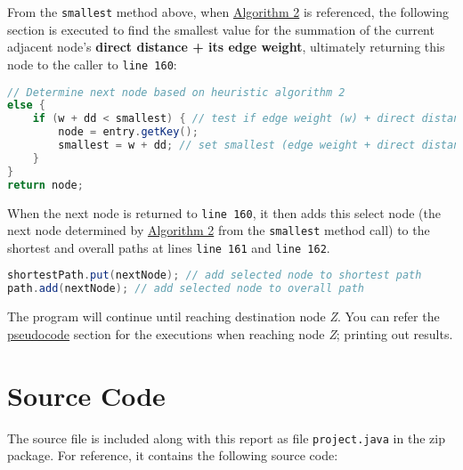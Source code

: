 From the \texttt{smallest} method above, when \hyperref[algo2]{Algorithm 2} is referenced, the following section is executed to find the smallest value for the summation of the current adjacent node's \textbf{direct distance + its edge weight}, ultimately returning this node to the caller to \texttt{line 160}:
\begin{lstlisting}[language=Java]
// Determine next node based on heuristic algorithm 2
else {
    if (w + dd < smallest) { // test if edge weight (w) + direct distance (dd) is smaller than previous
        node = entry.getKey();
        smallest = w + dd; // set smallest (edge weight + direct distance)
    }
}
return node;
\end{lstlisting}

When the next node is returned to \texttt{line 160}, it then adds this select node (the next node determined by \hyperref[algo2]{Algorithm 2} from the \texttt{smallest} method call) to the shortest and overall paths at lines \texttt{line 161} and \texttt{line 162}.
\begin{lstlisting}[language=Java]
shortestPath.put(nextNode); // add selected node to shortest path
path.add(nextNode); // add selected node to overall path
\end{lstlisting}

The program will continue until reaching destination node \emph{Z}. You can refer the \hyperref[pseudocode]{pseudocode} section for the executions when reaching node \emph{Z}; printing out results.

\newpage

\section*{Source Code}
The source file is included along with this report as file \texttt{project.java} in the zip package. For reference, it contains the following source code:




